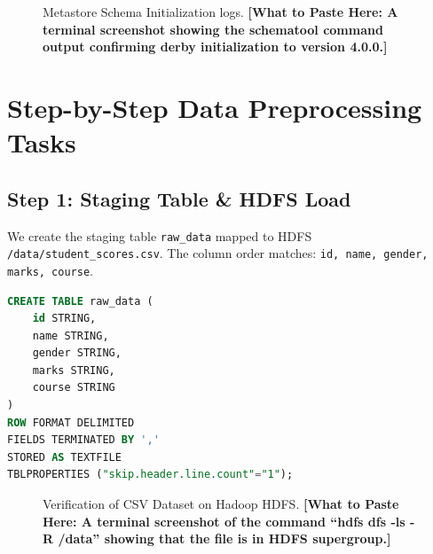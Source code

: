 \documentclass[11pt,a4paper]{article}
\begin{document}
\begin{figure}[H]
\centering
{}
\caption{Metastore Schema Initialization logs. \textbf{[What to Paste Here: A terminal screenshot showing the schematool command output confirming derby initialization to version 4.0.0.]}}
\label{fig:metastoreinit}
\end{figure}

\section{Step-by-Step Data Preprocessing Tasks}

\subsection{Step 1: Staging Table \& HDFS Load}
We create the staging table \texttt{raw\_data} mapped to HDFS \texttt{/data/student\_scores.csv}. The column order matches: \texttt{id, name, gender, marks, course}.
\begin{lstlisting}[language=SQL]
CREATE TABLE raw_data (
    id STRING,
    name STRING,
    gender STRING,
    marks STRING,
    course STRING
)
ROW FORMAT DELIMITED
FIELDS TERMINATED BY ','
STORED AS TEXTFILE
TBLPROPERTIES ("skip.header.line.count"="1");
\end{lstlisting}

\begin{figure}[H]
\centering
{}
\caption{Verification of CSV Dataset on Hadoop HDFS. \textbf{[What to Paste Here: A terminal screenshot of the command ``hdfs dfs -ls -R /data'' showing that the file is in HDFS supergroup.]}}
\label{fig:hdfsupload}
\end{figure}
\end{document}
